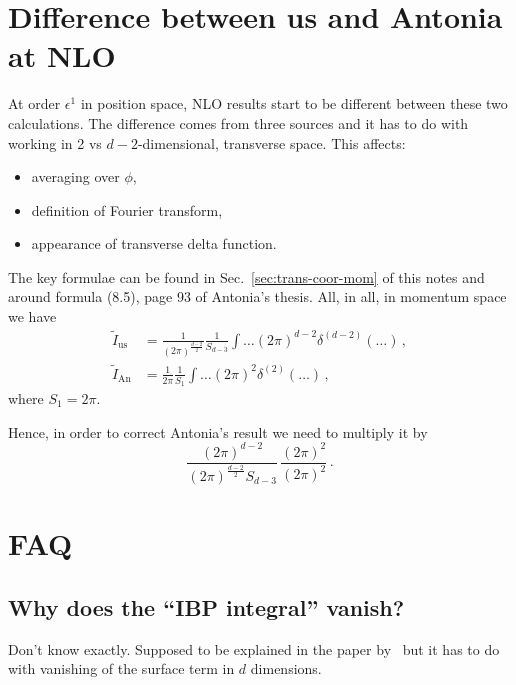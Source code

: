 \documentclass[a4paper,11pt]{report}
\numberwithin{equation}{section}
\begin{document}
\chapter{Difference between us and Antonia at NLO}

At order $\epsilon^1$ in position space, NLO results start to be different
between these two calculations. The difference comes from three sources and it
has to do with working in 2 vs $d-2$-dimensional, transverse space. This
affects:
%
\begin{itemize}
  \item
  averaging over $\phi$,
  \item
  definition of Fourier transform,
  \item
  appearance of transverse delta function.
\end{itemize}

The key formulae can be found in Sec.~\ref{sec:trans-coor-mom} of this notes and
around formula (8.5), page 93 of Antonia's thesis. All, in all, in momentum
space we have
%
\begin{align}
  \tilde I_\text{us} &= 
  \frac{1}{(2\pi)^{\frac{d-2}{2}}} \frac{1}{S_{d-3}}
  \int \ldots (2\pi)^{d-2} \delta^{(d-2)}(\ldots)\,,\\
  \tilde I_\text{An} &= 
  \frac{1}{2\pi} \frac{1}{S_{1}}
  \int \ldots (2\pi)^{2} \delta^{(2)}(\ldots)\,,
\end{align}
%
where $S_1 = 2\pi$.

Hence, in order to correct Antonia's result we need to multiply it by
%
\begin{equation}
  \frac{(2\pi)^{d-2}}{(2\pi)^{\frac{d-2}{2}} S_{d-3}} \,
  \frac{(2\pi)^2}{(2\pi)^2}\,.
\end{equation}

\chapter{FAQ}

\section*{Why does the ``IBP integral'' vanish?}

Don't know exactly. Supposed to be explained in the paper
by~\cite{Chetyrkin:1981qh} but it has to do with vanishing of the surface term
in $d$ dimensions.
\end{document}

